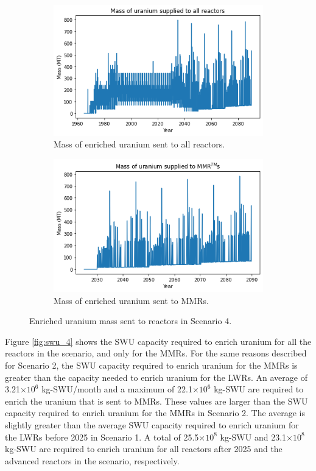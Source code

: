 \begin{figure}
    \centering
    \begin{subfigure}{0.45\textwidth}
        \centering
        \includegraphics[scale=0.4]{../figures/fuelsupply_scenarios_4.png}
        \caption{Mass of enriched uranium sent to all reactors.}
        \label{fig:totalfuel_4}
    \end{subfigure}
    \hspace{0.8cm}
    \begin{subfigure}{0.45\textwidth}
        \centering
        \includegraphics[scale=0.4]{../figures/advancedRX_fuelsupply_scenarios_4.png}
        \caption{Mass of enriched uranium sent to \glspl{MMR}.}
        \label{fig:haleu_4}
    \end{subfigure}
    \caption{Enriched uranium mass sent to reactors in Scenario 4.}
    \label{fig:fuel_4}
\end{figure}

Figure \ref{fig:swu_4} shows the \gls{SWU} capacity required to 
enrich uranium for all the reactors in the scenario, and 
only for the \glspl{MMR}. For the same reasons described for 
Scenario 2, the \gls{SWU} capacity required to enrich uranium 
for the \glspl{MMR} is greater than the capacity needed to 
enrich uranium for the \glspl{LWR}. An average of 3.21$\times 10^6$ 
kg-\gls{SWU}/month and a maximum of 22.1$\times 10^6$ kg-\gls{SWU}
are required to enrich the uranium that is sent to \glspl{MMR}. These values 
are larger than the \gls{SWU} 
capacity required to enrich uranium for the \glspl{MMR} in 
Scenario 2. The average is slightly greater than the average \gls{SWU} 
capacity required to enrich uranium for the \glspl{LWR} before 2025 in 
Scenario 1. A total of 25.5$\times 10^8$ kg-SWU and 23.1$\times 10^8$
kg-SWU are required to enrich uranium for all reactors after 2025 and the advanced 
reactors in the scenario, respectively. 

